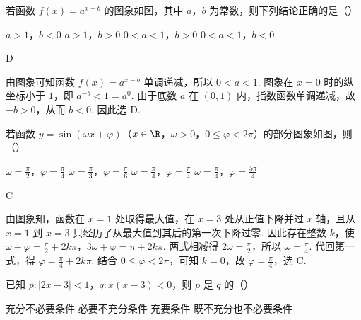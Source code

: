 \begin{problem}
若函数 \(f(x)=a^{x-b}\) 的图象如图，其中 \(a\)，\(b\) 为常数，则下列结论正确的是（\quad）


\choices
    {\(a > 1\)，\(b < 0\)}
    {\(a > 1\)，\(b > 0\)}
    {\(0 < a < 1\)，\(b > 0\)}
    {\(0 < a < 1\)，\(b < 0\)}
\end{problem}

\begin{answer}
D
\end{answer}

\begin{solution}
由图象可知函数 \(f(x)=a^{x-b}\) 单调递减，所以 \(0<a<1\). 图象在 \(x=0\) 时的纵坐标小于 \(1\)，即 \(a^{-b}<1=a^0\). 由于底数 \(a\) 在 \((0,1)\) 内，指数函数单调递减，故 \(-b>0\)，从而 \(b<0\). 因此选 D.
\end{solution}



\begin{problem}
若函数 \(y = \sin(\omega x + \varphi)\)（\(x \in \R\)，\(\omega > 0\)，\(0 \leqslant \varphi < 2\pi\)）的部分图象如图，则（\quad）


\choices
    {\(\omega = \frac{\pi}{2}\)，\(\varphi = \frac{\pi}{4}\)}
    {\(\omega = \frac{\pi}{3}\)，\(\varphi = \frac{\pi}{6}\)}
    {\(\omega = \frac{\pi}{4}\)，\(\varphi = \frac{\pi}{4}\)}
    {\(\omega = \frac{\pi}{4}\)，\(\varphi = \frac{5\pi}{4}\)}
\end{problem}

\begin{answer}
C
\end{answer}

\begin{solution}
由图象知，函数在 \(x=1\) 处取得最大值，在 \(x=3\) 处从正值下降并过 \(x\) 轴，且从 \(x=1\) 到 \(x=3\) 只经历了从最大值到其后的第一次下降过零. 因此存在整数 \(k\)，使 \(\omega+\varphi=\frac{\pi}{2}+2k\pi\)，\(3\omega+\varphi=\pi+2k\pi\).
两式相减得 \(2\omega=\frac{\pi}{2}\)，所以 \(\omega=\frac{\pi}{4}\). 代回第一式，得 \(\varphi=\frac{\pi}{4}+2k\pi\). 结合 \(0\leqslant\varphi<2\pi\)，可知 \(k=0\)，故 \(\varphi=\frac{\pi}{4}\)，选 C.
\end{solution}



\begin{problem}
已知 \(p: |2x - 3| < 1\)，\(q: x(x - 3) < 0\)，则 \(p\) 是 \(q\) 的（\quad）

\choices
    {充分不必要条件}
    {必要不充分条件}
    {充要条件}
    {既不充分也不必要条件}
\end{problem}


